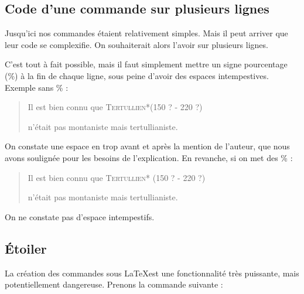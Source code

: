 \subsection{Code d'une commande sur plusieurs lignes}\label{commandepourcent}

Jusqu'ici nos commandes étaient relativement simples. Mais il peut arriver que leur code se complexifie. On souhaiterait alors l'avoir sur plusieurs lignes.

C'est tout à fait possible, mais il faut simplement mettre  un signe pourcentage (\%) à la fin de chaque ligne, sous peine d'avoir  des espaces intempestives. Exemple sans  \% :

\begin{latexcode}
\newcommand{\auteur}[2]{
    \textsc{#1}*(#2)
    }
\end{latexcode}

\renewcommand{\auteur}[2]{\underline{ }%
    \textsc{#1}*(#2)\underline{ }%
}

\begin{quotation}
Il est bien connu que \auteur{Tertullien}{150 ? - 220 ?}
n'était pas montaniste mais tertullianiste.
\end{quotation}

On constate une espace en trop avant et après la mention de l'auteur, que nous avons soulignée pour les besoins de l'explication.
En revanche, si on met des \% :

\begin{latexcode}
\newcommand{\auteur}[2]{%
    \textsc{#1} *(#2)%
    }
\end{latexcode}

\renewcommand{\auteur}[2]{%
    \textsc{#1}* (#2)%
}

\begin{quotation}
Il est bien connu que \auteur{Tertullien}{150 ? - 220 ?}
n'était pas montaniste mais tertullianiste.
\end{quotation}

On ne constate pas d'espace intempestifs.


\subsection{Étoiler }

La création des commandes sous \LaTeX est une fonctionnalité très puissante, mais potentiellement dangereuse. Prenons la commande suivante :

\begin{latexcode}
\newcommand{\auteur}[1]{\textsc{#1}*}
\end{latexcode}

